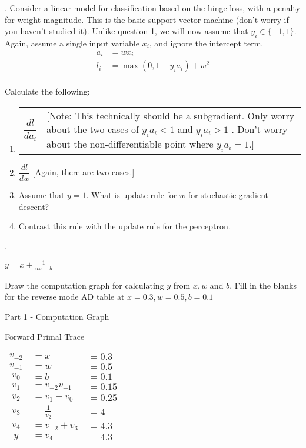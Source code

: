 \documentclass{article}
\begin{document}
. Consider a linear model for classification based on the hinge loss, with a penalty for weight magnitude. This is the basic support vector machine (don't worry if you haven't studied it). Unlike question 1, we will now assume that $y_i\in\{-1, 1\}$. Again, assume a single input variable $x_i$, and ignore the intercept term.
\begin{align*}
a_i &= wx_i \\
l_i &= \max (0, 1-y_i a_i) + w^2 \\
\end{align*}

Calculate the following: \\

{
\renewcommand{\theenumi}{\alph{enumi}}
\begin{enumerate}
\item \begin{tabular}{l l}$\dfrac{dl}{da_i}$ & \makecell[l]{[Note: This technically should be a subgradient.  Only worry about the two cases of \\ $y_i a_i < 1$ and $y_i a_i > 1$ . Don't worry about the non-differentiable point where $y_ia_i = 1$.]}\end{tabular}
\item $\dfrac{dl}{dw}$ [Again, there are two cases.]
\item Assume that $y = 1$.  What is update rule for $w$ for stochastic gradient descent?
\item Contrast this rule with the update rule for the perceptron.
\end{enumerate}
}
. \begin{center}
$y = x + \frac{1}{wx + b}$
\end{center}
Draw the computation graph for calculating $y$ from $x, w$ and $b$, Fill in the blanks for the reverse mode AD table at $x=0.3,w = 0.5,b=0.1$
\begin{center}
Part 1 - Computation Graph
\end{center}
\vspace{150pt}
\begin{center}
Forward Primal Trace
\end{center}
\begin{center}
\begin{tabular}{ c l l }
$v_{-2}$ & $= x$ & $= 0.3$  \\
$v_{-1}$ & $= w$ & $= 0.5$  \\
$v_{0}$ & $= b$ & $= 0.1$ \\
\hline
$v_1$ & $= v_{-2} v_{-1}$ & $= 0.15$ \\ 
$v_2$ & $= v_1 + v_{0}$ & $= 0.25$ \\
$v_3$ & $= \frac{1}{v_2}$ & $= 4$ \\ 
$v_4$ & $= v_{-2} + v_3$ & $= 4.3$ \\ 
\hline
$y$ & $= v_4$ & $= 4.3$ \\
\end{tabular}
\end{center}
\end{document}
